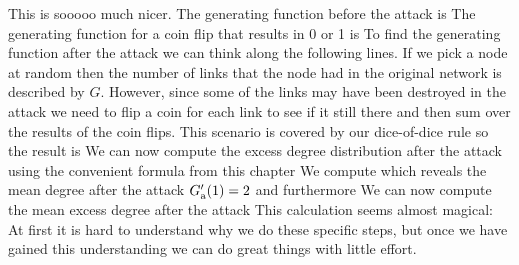\solution
This is sooooo much nicer. The generating function before the attack is 
The generating function for a coin flip that results in 0 or 1 is
To find the generating function after the attack we can think along the following lines. If we pick a node at random then the number of links that the node had in the original network is described by $G$. However, since some of the links may have been destroyed in the attack we need to flip a coin for each link to see if it still there and then sum over the results of the coin flips. This scenario is covered by our dice-of-dice rule so the result is 
We can now compute the excess degree distribution after the attack using the convenient formula from this chapter
We compute 
which reveals the mean degree after the attack $G'_{\rm a}(1)=2$ and furthermore 
We can now compute the mean excess degree after the attack
This calculation seems almost magical: At first it is hard to understand why we do these specific steps, but once we have gained this understanding we can do great things with little effort. 

\solutionend

